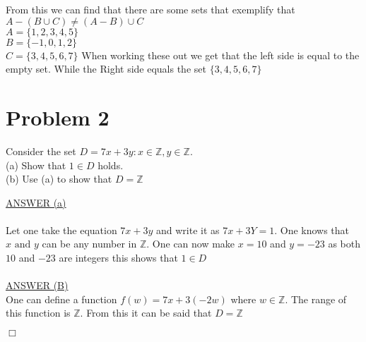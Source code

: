 \documentclass[12pt]{article}
\begin{document}
From this we can find that there are some sets that exemplify that $A-(B\cup C) \neq (A-B)\cup C$\\
$A = \{1,2,3,4,5\}$\\
$B = \{-1,0,1,2\}$\\
$C = \{3,4,5,6,7\}$
When working these out we get that the left side is equal to the empty set. While the Right side equals the set $\{3,4,5,6,7\}$

\section*{Problem 2}\label{Problem 2}
\begin{center}
        Consider the set $D = {7x+3y : x \in \mathbb{Z}, y \in \mathbb{Z}}$. \\
        (a) Show that $1 \in D$ holds.\\
        (b) Use (a) to show that $D = \mathbb{Z}$ \\
\end{center}
\underline{ANSWER (a)}\\
\\Let one take the equation $7x+3y$ and write it as $7x+3Y = 1$.
One knows that $x \text{ and } y$ can be any number in $\mathbb{Z}$.
One can now make $x=10$ and $y=-23$ as both $10$ and $-23$ are integers this shows that $1 \in D$\\
\\\underline{ANSWER (B)}\\

One can define a function  $f(w) = 7x+3(-2w)$ where $w \in \mathbb{Z}$.
The range of this function is $\mathbb{Z}$. From this it can be said that $D = \mathbb{Z}$
\begin{flushright}
        $\Box$
\end{flushright}
\end{document}
